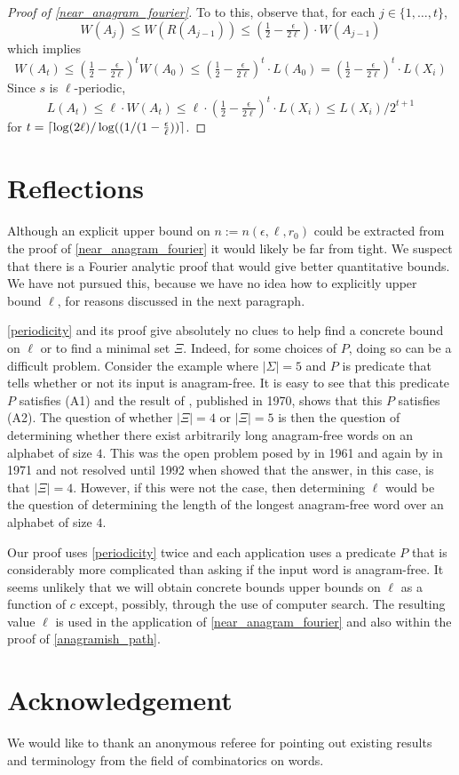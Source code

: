 \documentclass{patmorin}
\begin{document}
\begin{proof}[Proof of \cref{near_anagram_fourier}]
  To to this, observe that, for each $j\in\{1,\ldots,t\}$,
  \begin{equation}
      W(A_j)
        \le W(R(A_{j-1}))
        \le (\tfrac12-\tfrac{\epsilon}{2\ell})\cdot W(A_{j-1})
  \end{equation}
  which implies
  \[
       W(A_t)
       \le (\tfrac12-\tfrac{\epsilon}{2\ell})^t W(A_0) \le (\tfrac12-\tfrac{\epsilon}{2\ell})^t\cdot L(A_0)
       =  (\tfrac12-\tfrac{\epsilon}{2\ell})^t\cdot L(X_i)
  \]
  Since $s$ is $\ell$-periodic,
  \[
        L(A_t)\le \ell\cdot W(A_t) \le \ell\cdot(\tfrac12-\tfrac{\epsilon}{2\ell})^t\cdot L(X_i) \le L(X_i)/2^{t+1}
  \]
  for $t = {\lceil \log(2\ell)/\log((1/(1-\tfrac{\epsilon}{\ell})) \rceil}$.
\end{proof}

\section{Reflections}
\label{reflections}

Although an explicit upper bound on $n:=n(\epsilon,\ell,r_0)$ could be extracted from the proof of \cref{near_anagram_fourier} it would likely be far from tight.  We suspect that there is a Fourier analytic proof that would give better quantitative bounds.  We have not pursued this, because we have no idea how to explicitly upper bound $\ell$, for reasons discussed in the next paragraph.

\cref{periodicity} and its proof give absolutely no clues to help find a concrete bound on $\ell$ or to find a minimal set $\Xi$. Indeed, for some choices of $P$, doing so can be a difficult problem.  Consider the example where $|\Sigma|=5$ and $P$ is predicate that tells whether or not its input is anagram-free. It is easy to see that this predicate $P$ satisfies (A1) and the result of \citet{pleasants:non-repetitive}, published in 1970, shows that this $P$ satisfies (A2).  The question of whether $|\Xi|=4$ or $|\Xi|=5$ is then the question of determining whether there exist arbitrarily long anagram-free words on an alphabet of size $4$.  This was the open problem posed by \citet{erdos:some} in 1961 and again by \citet{brown:is} in 1971 and not resolved until 1992 when \citet{keranen:abelian,keranen:powerful} showed that the answer, in this case, is that $|\Xi|=4$.  However, if this were not the case, then determining $\ell$ would be the question of determining the length of the longest anagram-free word over an alphabet of size $4$.

Our proof uses \cref{periodicity} twice and each application uses a predicate $P$ that is considerably more complicated than asking if the input word is anagram-free. It seems unlikely that we will obtain concrete bounds upper bounds on $\ell$ as a function of $c$ except, possibly, through the use of computer search. The resulting value $\ell$ is used in the application of \cref{near_anagram_fourier} and also within the proof of \cref{anagramish_path}.

\section{Acknowledgement}

We would like to thank an anonymous referee for pointing out existing results and terminology from the field of combinatorics on words.



\end{document}
